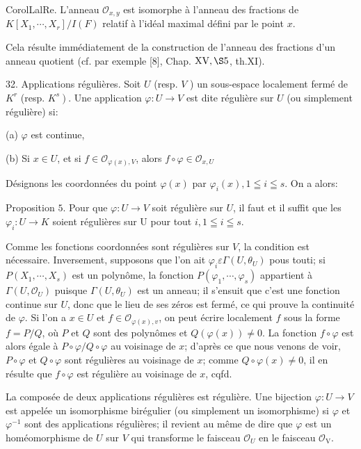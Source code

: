 CorolLalRe. L'anneau $\mathcal{O}_{x, y}$ est isomorphe à l'anneau des fractions de $K\left[X_{1}, \cdots, X_{r}\right] / I(F)$ relatif à l'idéal maximal défini par le point $x$.

Cela résulte immédiatement de la construction de l'anneau des fractions d'un anneau quotient (cf. par exemple [8], Chap. $\mathrm{XV}, \S 5$, th.XI).

32. Applications régulières. Soit $U$ (resp. $V$ ) un sous-espace localement fermé de $K^{r}$ (resp. $\left.K^{s}\right)$. Une application $\varphi: U \rightarrow V$ est dite régulière sur $U$ (ou simplement régulière) si:

(a) $\varphi$ est continue,

(b) Si $x \in U$, et si $f \in \mathcal{O}_{\varphi(x), V}$, alors $f \circ \varphi \in \mathcal{O}_{x, U}$

Désignons les coordonnées du point $\varphi(x)$ par $\varphi_{i}(x), 1 \leqq i \leqq s .$ On a alors:

Proposition $5 .$ Pour que $\varphi: U \rightarrow V$ soit régulière sur $U$, il faut et il suffit que les $\varphi_{i}: U \rightarrow K$ soient régulières sur U pour tout $i, 1 \leqq i \leqq s .$

Comme les fonctions coordonnées sont régulières sur $V$, la condition est nécessaire. Inversement, supposons que l'on ait $\varphi_{i} \varepsilon \Gamma\left(U, \theta_{U}\right)$ pous touti; si $P\left(X_{1}, \cdots, X_{s}\right)$ est un polynôme, la fonction $P\left(\varphi_{1}, \cdots, \varphi_{s}\right)$ appartient à $\Gamma\left(U, \mathcal{O}_{U}\right)$ puisque $\Gamma\left(U, \theta_{U}\right)$ est un anneau; il s'ensuit que c'est une fonction continue sur $U$, donc que le lieu de ses zéros est fermé, ce qui prouve la continuité de $\varphi$. Si l'on a $x \in U$ et $f \in \mathcal{O}_{\varphi(x), v}$, on peut écrire localement $f$ sous la forme $f=P / Q$, où $P$ et $Q$ sont des polynômes et $Q(\varphi(x)) \neq 0 .$ La fonction $f \circ \varphi$ est alors égale à $P \circ \varphi / Q \circ \varphi$ au voisinage de $x$; d'après ce que nous venons de voir, $P \circ \varphi$ et $Q \circ \varphi$ sont régulières au voisinage de $x$; comme $Q \circ \varphi(x) \neq 0$, il en résulte que $f \circ \varphi$ est régulière au voisinage de $x$, cqfd.

La composée de deux applications régulières est régulière. Une bijection $\varphi: U \rightarrow V$ est appelée un isomorphisme birégulier (ou simplement un isomorphisme) si $\varphi$ et $\varphi^{-1}$ sont des applications régulières; il revient au même de dire que $\varphi$ est un homéomorphisme de $U$ sur $V$ qui transforme le faisceau $\mathcal{O}_{U}$ en le faisceau $\mathcal{O}_{\mathrm{V}}$.

